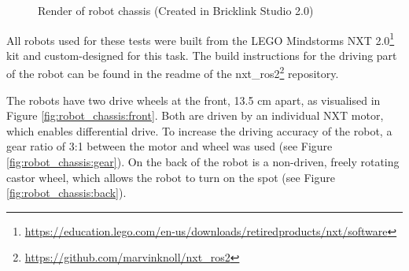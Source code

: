 \begin{figure}[h!]
    \centering
    \hfill
    \par
    \caption{Render of robot chassis (Created in Bricklink Studio 2.0)}
    \label{fig:robot_chassis}
\end{figure}

All robots used for these tests were built from the LEGO Mindstorms NXT 2.0\footnote{\url{https://education.lego.com/en-us/downloads/retiredproducts/nxt/software}} kit and custom-designed for this task. The build instructions for the driving part of the robot can be found in the readme of the nxt\_ros2\footnote{\url{https://github.com/marvinknoll/nxt_ros2}} repository.

The robots have two drive wheels at the front, 13.5 cm apart, as visualised in Figure \ref{fig:robot_chassis:front}. Both are driven by an individual NXT motor, which enables differential drive. To increase the driving accuracy of the robot, a gear ratio of 3:1 between the motor and wheel was used (see Figure \ref{fig:robot_chassis:gear}). On the back of the robot is a non-driven, freely rotating castor wheel, which allows the robot to turn on the spot (see Figure \ref{fig:robot_chassis:back}).

